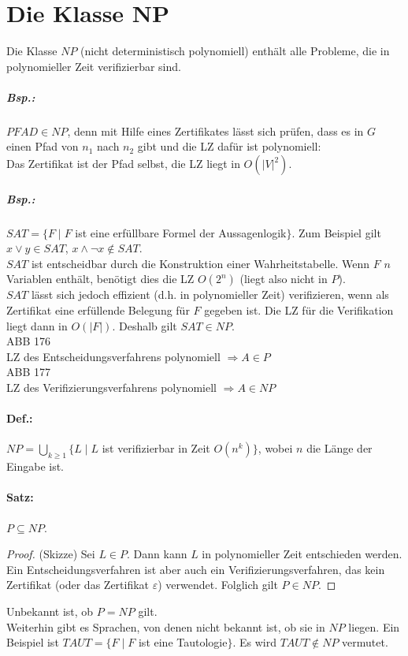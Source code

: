 \section{Die Klasse NP}
Die Klasse $NP$ (nicht deterministisch polynomiell) enthält alle Probleme, die in polynomieller Zeit verifizierbar sind.
\subparagraph{Bsp.:} $PFAD \in NP$, denn mit Hilfe eines Zertifikates lässt sich prüfen, dass es in $G$ einen Pfad von $n_1$ nach $n_2$ gibt und die LZ dafür ist polynomiell:\\
Das Zertifikat ist der Pfad selbst, die LZ liegt in $O(|V|^2)$.
\subparagraph{Bsp.:} $SAT=\{F\;|\;F$ ist eine erfüllbare Formel der Aussagenlogik$\}$. Zum Beispiel gilt $x\vee y \in SAT$, $x\wedge \neg x \not \in SAT$.\\
$SAT$ ist entscheidbar durch die Konstruktion einer Wahrheitstabelle. Wenn $F$ $n$ Variablen enthält, benötigt dies die LZ $O(2^n)$ (liegt also nicht in $P$).\\
$SAT$ lässt sich jedoch effizient (d.h. in polynomieller Zeit) verifizieren, wenn als Zertifikat eine erfüllende Belegung für $F$ gegeben ist. Die LZ für die Verifikation liegt dann in $O(|F|)$. Deshalb gilt $SAT \in NP$.\\
ABB 176\\
LZ des Entscheidungsverfahrens polynomiell $\Rightarrow A \in P$ \\
ABB 177\\
LZ des Verifizierungsverfahrens polynomiell $\Rightarrow A \in NP$
\paragraph{Def.:} $NP = \bigcup_{k\geq 1}\{L\;|\; L$ ist verifizierbar in Zeit $O(n^k)\}$, wobei $n$ die Länge der Eingabe ist.

\paragraph{Satz:} $P \subseteq NP$.
\begin{proof}
(Skizze) Sei $L \in P$. Dann kann $L$ in polynomieller Zeit entschieden werden. Ein Entscheidungsverfahren ist aber auch ein Verifizierungsverfahren, das kein Zertifikat (oder das Zertifikat $\varepsilon$) verwendet. Folglich gilt $P \in NP$.
\end{proof}
Unbekannt ist, ob $P=NP$ gilt.\\
Weiterhin gibt es Sprachen, von denen nicht bekannt ist, ob sie in $NP$ liegen. Ein Beispiel ist $TAUT=\{F\;|\; F$ ist eine Tautologie$\}$. Es wird $TAUT \not \in NP$ vermutet.

